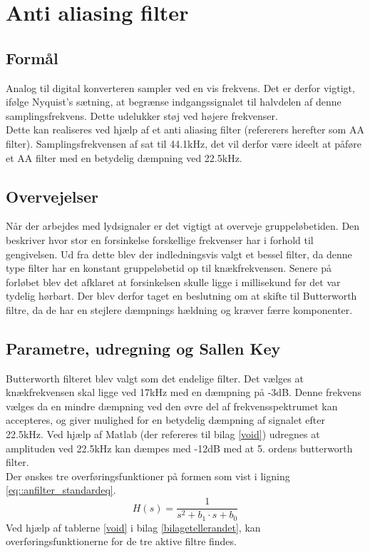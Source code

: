 
\section{Anti aliasing filter}
\subsection{Formål}
Analog til digital konverteren sampler ved en vis frekvens. Det er derfor vigtigt, ifølge Nyquist’s sætning, at begrænse indgangssignalet til halvdelen af denne samplingsfrekvens. Dette udelukker støj ved højere frekvenser.\\

Dette kan realiseres ved hjælp af et anti aliasing filter (refererers herefter som AA filter). Samplingsfrekvensen af sat til 44.1kHz, det vil derfor være ideelt at påføre et AA filter med en betydelig dæmpning ved 22.5kHz.\\
\subsection{Overvejelser}
Når der arbejdes med lydsignaler er det vigtigt at overveje gruppeløbetiden. Den beskriver hvor stor en forsinkelse forskellige frekvenser har i forhold til gengivelsen. Ud fra dette blev der indledningsvis valgt et bessel filter, da denne type filter har en konstant gruppeløbetid op til knækfrekvensen. Senere på forløbet blev det afklaret at forsinkelsen skulle ligge i millisekund før det var tydelig hørbart. Der blev derfor taget en beslutning om at skifte til Butterworth filtre, da de har en stejlere dæmpnings hældning og kræver færre komponenter.
\subsection{Parametre, udregning og Sallen Key}\label{sec::anfilter_sallenpara}
Butterworth filteret blev valgt som det endelige filter. 
Det vælges at knækfrekvensen skal ligge ved 17kHz med en dæmpning på -3dB. Denne frekvens vælges da en mindre dæmpning ved den øvre del af frekvensspektrumet kan accepteres, og giver mulighed for en betydelig dæmpning af signalet efter 22.5kHz. Ved hjælp af Matlab (der refereres til bilag \ref{void}) udregnes at amplituden ved 22.5kHz kan dæmpes med -12dB med at 5. ordens butterworth filter.\\
Der ønskes tre overføringsfunktioner på formen som vist i ligning \ref{eq::anfilter_standardeq}.
\begin{equation}
	H(s) = \dfrac{1}{s^2+b_1\cdot s + b_0}\label{eq::anfilter_standardeq}
\end{equation}
Ved hjælp af tablerne \ref{void} i bilag \ref{bilagetellerandet}, kan overføringsfunktionerne for de tre aktive filtre findes.

